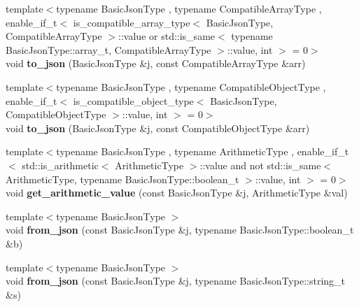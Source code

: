 \begin{DoxyCompactItemize}
\item 
\mbox{\label{namespacenlohmann_1_1detail_a3afebc132c5ff83f9cd160e52030fdfd}} 
{\footnotesize template$<$typename Basic\+Json\+Type , typename Compatible\+Array\+Type , enable\+\_\+if\+\_\+t$<$ is\+\_\+compatible\+\_\+array\+\_\+type$<$ Basic\+Json\+Type, Compatible\+Array\+Type $>$\+::value or std\+::is\+\_\+same$<$ typename Basic\+Json\+Type\+::array\+\_\+t, Compatible\+Array\+Type $>$\+::value, int $>$  = 0$>$ }\\void {\bfseries to\+\_\+json} (Basic\+Json\+Type \&j, const Compatible\+Array\+Type \&arr)
\item 
\mbox{\label{namespacenlohmann_1_1detail_a6fa2f784014bfc0b62d7a35d51e676c9}} 
{\footnotesize template$<$typename Basic\+Json\+Type , typename Compatible\+Object\+Type , enable\+\_\+if\+\_\+t$<$ is\+\_\+compatible\+\_\+object\+\_\+type$<$ Basic\+Json\+Type, Compatible\+Object\+Type $>$\+::value, int $>$  = 0$>$ }\\void {\bfseries to\+\_\+json} (Basic\+Json\+Type \&j, const Compatible\+Object\+Type \&arr)
\item 
\mbox{\label{namespacenlohmann_1_1detail_a85955b9c6dd31846e4b8e891f78614b6}} 
{\footnotesize template$<$typename Basic\+Json\+Type , typename Arithmetic\+Type , enable\+\_\+if\+\_\+t$<$ std\+::is\+\_\+arithmetic$<$ Arithmetic\+Type $>$\+::value and not std\+::is\+\_\+same$<$ Arithmetic\+Type, typename Basic\+Json\+Type\+::boolean\+\_\+t $>$\+::value, int $>$  = 0$>$ }\\void {\bfseries get\+\_\+arithmetic\+\_\+value} (const Basic\+Json\+Type \&j, Arithmetic\+Type \&val)
\item 
\mbox{\label{namespacenlohmann_1_1detail_a58117f225f43d03e3a0a4a6f3d77c9d9}} 
{\footnotesize template$<$typename Basic\+Json\+Type $>$ }\\void {\bfseries from\+\_\+json} (const Basic\+Json\+Type \&j, typename Basic\+Json\+Type\+::boolean\+\_\+t \&b)
\item 
\mbox{\label{namespacenlohmann_1_1detail_ad74d89f77ada7a57eff38b43d4bf2335}} 
{\footnotesize template$<$typename Basic\+Json\+Type $>$ }\\void {\bfseries from\+\_\+json} (const Basic\+Json\+Type \&j, typename Basic\+Json\+Type\+::string\+\_\+t \&s)

\end{DoxyCompactItemize}
